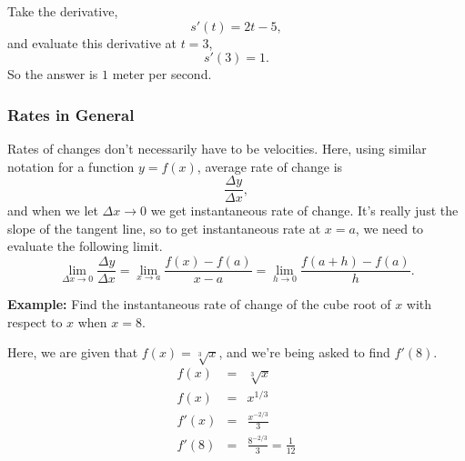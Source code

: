\documentclass[12pt,addpoints, answers, fleqn]{exam}
\begin{document}
\begin{solution}
Take the derivative,
\[
s' \left( t \right) = 2t-5,
\]
and evaluate this derivative at $t=3$,
\[
s' \left( 3 \right) = 1.
\]
So the answer is $1$ meter per second.
\end{solution}

\subsubsection{Rates in General}

Rates of changes don't necessarily have to be velocities. Here, using similar notation for a function $y = f\left(x\right)$, average rate of change is
\[
\frac{\Delta y}{\Delta x},
\]
and when we let $\Delta x \to 0$ we get instantaneous rate of change. It's really just the slope of the tangent line, so to get instantaneous rate at $x=a$, we need to evaluate the following limit.
\[
\mathop {\lim }\limits_{\Delta x \to 0 } \frac{\Delta y}{\Delta x} = \mathop {\lim }\limits_{x \to a } \frac{f\left(x\right) - f\left(a\right)}{x-a} =
\mathop {\lim }\limits_{h \to 0 } \frac{f\left(a + h\right) - f\left(a\right)}{h}.
\]



\textbf{Example:} Find the instantaneous rate of change of the cube root of $x$ with respect to $x$ when $x=8$. 

\begin{solution}
Here, we are  given that $f\left(x\right) = \sqrt[3]{x}$, and we're being asked to find $f'\left(8\right)$.
\begin{eqnarray*}
f\left(x\right) &=& \sqrt[3]{x}\\
f\left(x\right) &=& x^{1/3}\\
f'\left(x\right) &=& \frac{x^{-2/3}}{3}\\
f'\left(8\right) &=& \frac{8^{-2/3}}{3} = \frac{1}{12}
\end{eqnarray*}

\end{solution}



 
 
\end{document}
